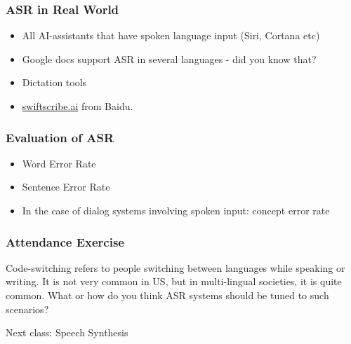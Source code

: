 \documentclass{beamer}
\begin{document}
\begin{frame}
\frametitle{ASR in Real World}
\begin{itemize}
\item All AI-assistants that have spoken language input (Siri, Cortana etc)
\item Google docs support ASR in several languages - did you know that?
\item Dictation tools
\item  \url{swiftscribe.ai} from Baidu.
\end{itemize}
\end{frame}

\begin{frame}
\frametitle{Evaluation of ASR}
\begin{itemize}
\item Word Error Rate
\item Sentence Error Rate
\item In the case of dialog systems involving spoken input: concept error rate
\end{itemize}
\end{frame}

\begin{frame}
\frametitle{Attendance Exercise}
Code-switching refers to people switching between languages while speaking or writing. It is not very common in US, but in multi-lingual societies, it is quite common. What or how do you think ASR systems should be tuned to such scenarios? 

\bigskip \bigskip Next class: Speech Synthesis
\end{frame}
\end{document}
